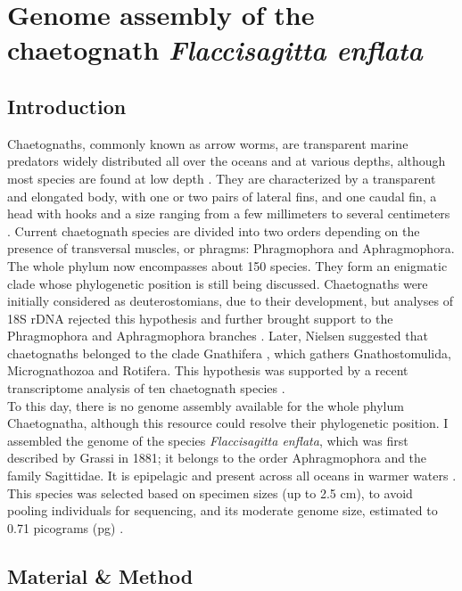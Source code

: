 
\chapter{Genome assembly of the chaetognath \textit{Flaccisagitta enflata}}

\section{Introduction}

Chaetognaths, commonly known as arrow worms, are transparent marine predators widely distributed all over the oceans and at various depths, although most species are found at low depth \cite{alvarino1964bathymetric}. They are characterized by a transparent and elongated body, with one or two pairs of lateral fins, and one caudal fin, a head with hooks and a size ranging from a few millimeters to several centimeters \cite{ghirardelli1969}. Current chaetognath species are divided into two orders depending on the presence of transversal muscles, or phragms: Phragmophora and Aphragmophora. The whole phylum now encompasses about 150 species. They form an enigmatic clade whose phylogenetic position is still being discussed. Chaetognaths were initially considered as deuterostomians, due to their development, but analyses of 18S rDNA rejected this hypothesis \cite{telford1993phylogenetic,wada1994details} and further brought support to the Phragmophora and Aphragmophora branches \cite{telford1997evolution}. Later, Nielsen suggested that chaetognaths belonged to the clade Gnathifera \cite{nielsen2011}, which gathers Gnathostomulida, Micrognathozoa and Rotifera. This hypothesis was supported by a recent transcriptome analysis of ten chaetognath species \cite{marletaz2019new}.  \\
To this day, there is no genome assembly available for the whole phylum Chaetognatha, although this resource could resolve their phylogenetic position. I assembled the genome of the species \textit{Flaccisagitta enflata}, which was first described by Grassi in 1881; it belongs to the order Aphragmophora and the family Sagittidae. It is epipelagic and present across all oceans in warmer waters \cite{michel1984}. This species was selected based on specimen sizes (up to 2.5 cm), to avoid pooling individuals for sequencing, and its moderate genome size, estimated to 0.71 picograms (pg) \cite{animal_genome_size}. \\

\section{Material \& Method}

